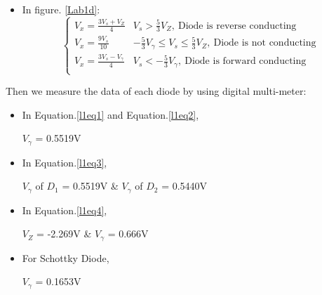 \begin{itemize}
        \item In figure. \ref{Lab1d}:
        \begin{equation}
            \begin{cases}
                V_x = \frac{3V_s+V_Z}{4} & V_s > \frac{5}{3}V_Z,~\text{Diode is reverse conducting}\\
                V_x = \frac{9V_s}{10} & -\frac{5}{3}V_\gamma \le V_s \le \frac{5}{3}V_Z,~\text{Diode is not conducting}\\
                V_x = \frac{3V_s-V_\gamma}{4} & V_s < -\frac{5}{3}V_\gamma,~\text{Diode is forward conducting}\\
            \end{cases}
        \label{l1eq4}
        \end{equation}
    \end{itemize}
    \FloatBarrier
    Then we measure the data of each diode by using digital multi-meter:\par
    \begin{itemize}
        \item In Equation.\ref{l1eq1} and Equation.\ref{l1eq2},\par
        $V_\gamma$ = 0.5519V
        \item In Equation.\ref{l1eq3},\par
        $V_\gamma$ of $D_1$ = 0.5519V \& $V_\gamma$ of $D_2$ = 0.5440V 
        \item In Equation.\ref{l1eq4},\par
        $V_Z$ = -2.269V \& $V_\gamma$ = 0.666V
        \item For Schottky Diode,\par
        $V_\gamma$ = 0.1653V
    \end{itemize}
    \FloatBarrier
    
    
